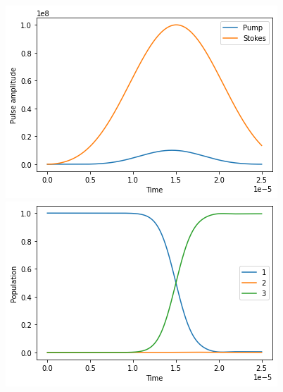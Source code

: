 \documentclass[%
 reprint,
 amsmath,amssymb,
 aps,
]{revtex4-2}
\begin{document}
\begin{figure}[ht]
    \label{fig:sim3}
    \centering
    \begin{minipage}{0.47\textwidth}
        \centering
        \includegraphics[width=\textwidth]{images/sim-3-pulse.png} %
    \end{minipage}\hfill
    \begin{minipage}{0.47\textwidth}
        \centering
        \includegraphics[width=\textwidth]{images/sim-3-pop.png} %
    \end{minipage}

\end{figure}
\end{document}
